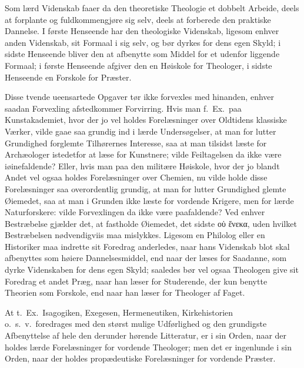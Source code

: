\documentclass[12pt,a4paper]{book}
\newcommand{\opage}[1]{\marginnote{\footnotesize\textit{[#1]}}}
\begin{document}
Som lærd Videnskab faaer da den theoretiske Theologie et dobbelt Arbeide,
deels at forplante og fuldkommengjøre sig selv, deels at forberede den
praktiske Dannelse. I første Henseende har den theologiske Videnskab, ligesom
enhver anden Videnskab, sit Formaal i sig selv, og bør dyrkes for dens egen
Skyld; i sidste Henseende bliver den at afbenytte som Middel for et
\opage{160} udenfor liggende Formaal; i første Henseende afgiver den en Høiskole for
Theologer, i sidste Henseende en Forskole for Præster.

Disse tvende ueensartede Opgaver tør ikke forvexles med hinanden, enhver
saadan Forvexling afstedkommer Forvirring. Hvis man f.\ Ex.\ paa
Kunstakademiet, hvor der jo vel holdes Forelæsninger over Oldtidens klassiske
Værker, vilde gaae saa grundig ind i lærde Undersøgelser, at man for lutter
Grundighed forglemte Tilhørernes Interesse, saa at man tilsidst læste for
Archæologer istedetfor at læse for Kunstnere; vilde Feiltagelsen da ikke være
iøinefaldende? Eller, hvis man paa den militære Høiskole, hvor der jo blandt
Andet vel ogsaa holdes Forelæsninger over Chemien, nu vilde holde disse
Forelæsninger saa overordentlig grundig, at man for lutter Grundighed glemte
Øiemedet, saa at man i Grunden ikke læste for vordende Krigere, men for lærde
Naturforskere: vilde Forvexlingen da ikke være paafaldende? Ved enhver
Bestræbelse gjælder det, at fastholde Øiemedet, det sidste οὑ ἕνεκα, uden
hvilket Bestræbelsen nødvendigviis maa mislykkes. Ligesom en Philolog eller
en Historiker maa indrette sit Foredrag anderledes, naar hans Videnskab blot
skal afbenyttes som høiere Dannelsesmiddel, end naar der læses for Saadanne,
som dyrke Videnskaben for dens egen Skyld; saaledes bør vel ogsaa Theologen
give sit Foredrag et andet Præg, naar han læser for Studerende, der kun
benytte Theorien som Forskole, end naar han læser for Theologer af Faget.

At t.\ Ex.\ Isagogiken, Exegesen, Hermeneutiken, Kirkehistorien o.\ s.\ v.\
foredrages med den størst mulige Udførlighed og den grundigste Afbenyttelse
af hele den derunder hørende Litteratur, er i sin Orden, naar der holdes
lærde Forelæsninger for vordende Theologer; men det er ingenlunde i sin
Orden, naar der holdes propædeutiske Forelæsninger for vordende Præster.
\end{document}

